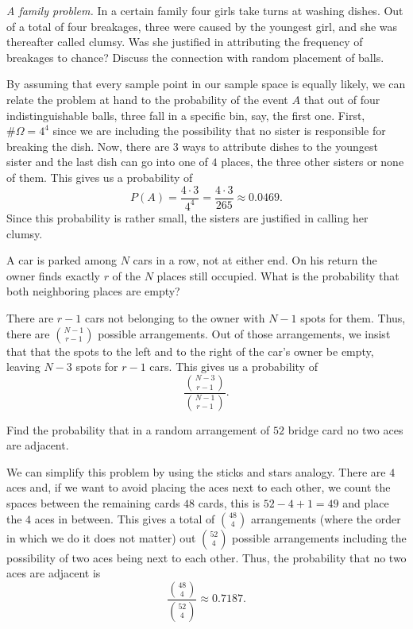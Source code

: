 \begin{problem}[Handout 2, \# 14]
  \emph{A family problem.} In a certain family four girls take turns at
  washing dishes. Out of a total of four breakages, three were caused by
  the youngest girl, and she was thereafter called clumsy. Was she
  justified in attributing the frequency of breakages to chance? Discuss
  the connection with random placement of balls.
\end{problem}
\begin{solution}
  By assuming that every sample point in our sample space is equally
  likely, we can relate the problem at hand to the probability of the event
  \(A\) that out of four indistinguishable balls, three fall in a specific
  bin, say, the first one. First, \(\#\Omega=4^4\) since we are including
  the possibility that no sister is responsible for breaking the dish. Now,
  there are \(3\) ways to attribute dishes to the youngest sister and the
  last dish can go into one of \(4\) places, the three other sisters or
  none of them. This gives us a probability of
  \[
    P(A)=\frac{4\cdot 3}{4^4}=\frac{4\cdot 3}{265}\approx 0.0469.
  \]
  Since this probability is rather small, the sisters are justified in
  calling her clumsy.
\end{solution}
\newpage

\begin{problem}[Handout 2, \# 15]
  A car is parked among \(N\) cars in a row, not at either end. On his
  return the owner finds exactly \(r\) of the \(N\) places still
  occupied. What is the probability that both neighboring places are empty?
\end{problem}
\begin{solution}
  There are \(r-1\) cars not belonging to the owner with \(N-1\) spots for
  them. Thus, there are \(\binom{N-1}{r-1}\) possible
  arrangements. Out of those arrangements, we insist that that the spots to
  the left and to the right of the car's owner be empty, leaving \(N-3\)
  spots for \(r-1\) cars. This gives us a probability of
  \[
    \frac{\binom{N-3}{r-1}}{\binom{N-1}{r-1}}.
  \]
\end{solution}
\newpage

\begin{problem}[Handout 2, \# 16]
  Find the probability that in a random arrangement of \(52\) bridge card
  no two aces are adjacent.
\end{problem}
\begin{solution}
  We can simplify this problem by using the sticks and stars analogy. There
  are \(4\) aces and, if we want to avoid placing the aces next to each
  other, we count the spaces between the remaining cards \(48\) cards, this
  is \(52-4+1=49\) and place the \(4\) aces in between. This gives a total
  of \(\binom{48}{4}\) arrangements (where the order in which
  we do it does not matter) out \(\binom{52}{4}\) possible
  arrangements including the possibility of two aces being next to each
  other. Thus, the probability that no two aces are adjacent is
  \[
    \frac{\binom{48}{4}}{\binom{52}{4}}\approx 0.7187.
  \]
\end{solution}
\newpage

